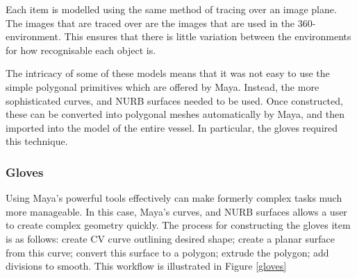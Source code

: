 \documentclass[a4paper, openright, twoside]{book}
\begin{document}
Each item is modelled using the same method of tracing over an image plane. The images that are traced over are the images that are used in the 360-environment. This ensures that there is little variation between the environments for how recognisable each object is. 

The intricacy of some of these models means that it was not easy to use the simple polygonal primitives which are offered by Maya. Instead, the more sophisticated curves, and NURB surfaces needed to be used. Once constructed, these can be converted into polygonal meshes automatically by Maya, and then imported into the model of the entire vessel. In particular, the gloves required this technique. 

\subsubsection{Gloves}
Using Maya's powerful tools effectively can make formerly complex tasks much more manageable. In this case, Maya's curves, and NURB surfaces allows a user to create complex geometry quickly. The process for constructing the gloves item is as follows: create CV curve outlining desired shape; create a planar surface from this curve; convert this surface to a polygon; extrude the polygon; add divisions to smooth. This workflow is illustrated in Figure \ref{gloves}
\end{document}
